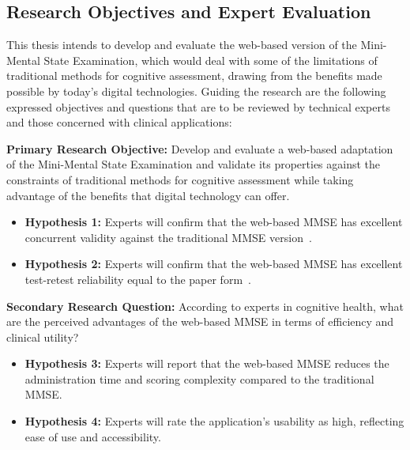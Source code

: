 \subsection{Research Objectives and Expert Evaluation} 

This thesis intends to develop and evaluate the web-based version of the Mini-Mental State Examination, which would deal with some of the limitations of traditional methods for cognitive assessment, drawing from the benefits made possible by today's digital technologies. Guiding the research are the following expressed objectives and questions that are to be reviewed by technical experts and those concerned with clinical applications:

\textbf{Primary Research Objective:}
Develop and evaluate a web-based adaptation of the Mini-Mental State Examination and validate its properties against the constraints of traditional methods for cognitive assessment while taking advantage of the benefits that digital technology can offer.

\begin{itemize}
    \item \textbf{Hypothesis 1:} Experts will confirm that the web-based MMSE has excellent concurrent validity against the traditional MMSE version~\cite{folstein1975mini}.
    \item \textbf{Hypothesis 2:} Experts will confirm that the web-based MMSE has excellent test-retest reliability equal to the paper form~\cite{tombaugh1992mini}.
\end{itemize}

\textbf{Secondary Research Question:}
According to experts in cognitive health, what are the perceived advantages of the web-based MMSE in terms of efficiency and clinical utility?

\begin{itemize}
    \item \textbf{Hypothesis 3:} Experts will report that the web-based MMSE reduces the administration time and scoring complexity compared to the traditional MMSE.
    \item \textbf{Hypothesis 4:} Experts will rate the application's usability as high, reflecting ease of use and accessibility.
\end{itemize}

